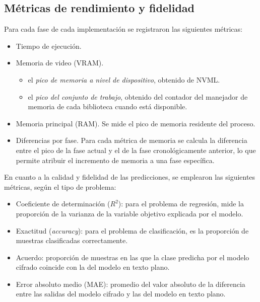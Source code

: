 \subsection{Métricas de rendimiento y fidelidad}\label{sec:metodo_metricas}

Para cada fase de cada implementación se registraron las siguientes métricas:

\begin{itemize}
    \item Tiempo de ejecución.

    \item Memoria de video (VRAM).
    \begin{itemize}
        \item el \textit{pico de memoria a nivel de dispositivo}, obtenido de NVML.
        \item el \textit{pico del conjunto de trabajo}, obtenido del contador del manejador de memoria de cada biblioteca cuando está disponible.
    \end{itemize}

    \item Memoria principal (RAM). Se mide el pico de memoria residente del proceso.

    \item Diferencias por fase. Para cada métrica de memoria se calcula la diferencia entre el pico de la fase actual y el de la fase cronológicamente anterior, lo que permite atribuir el incremento de memoria a una fase específica.
\end{itemize}

En cuanto a la calidad y fidelidad de las predicciones, se emplearon las siguientes métricas, según el tipo de problema:

\begin{itemize}
    \item Coeficiente de determinación ($R^2$): para el problema de regresión, mide la proporción de la varianza de la variable objetivo explicada por el modelo.

    \item Exactitud (\textit{accuracy}): para el problema de clasificación, es la proporción de muestras clasificadas correctamente.

    \item Acuerdo: proporción de muestras en las que la clase predicha por el modelo cifrado coincide con la del modelo en texto plano.

    \item Error absoluto medio (MAE): promedio del valor absoluto de la diferencia entre las salidas del modelo cifrado y las del modelo en texto plano.

\end{itemize}

